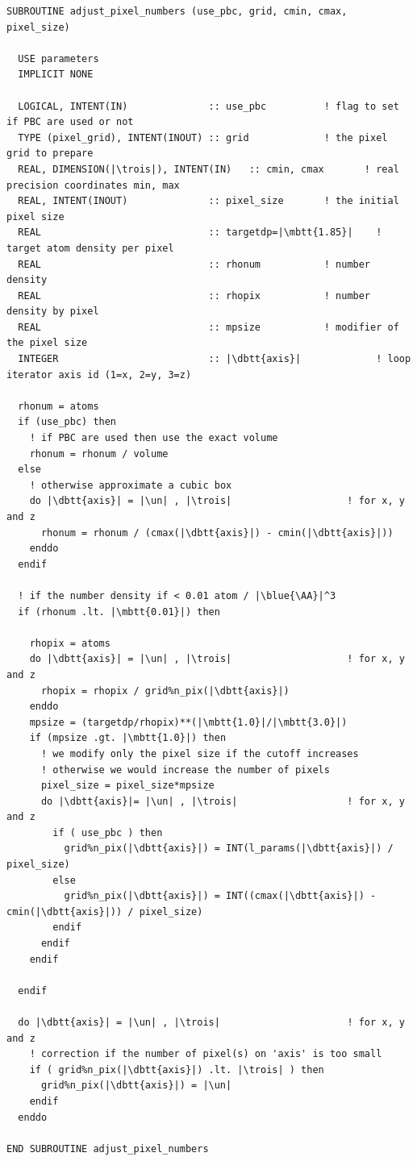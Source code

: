 \begin{lstlisting}[language={[90]FORTRAN}]
SUBROUTINE adjust_pixel_numbers (use_pbc, grid, cmin, cmax, pixel_size)

  USE parameters
  IMPLICIT NONE
  
  LOGICAL, INTENT(IN)              :: use_pbc          ! flag to set if PBC are used or not
  TYPE (pixel_grid), INTENT(INOUT) :: grid             ! the pixel grid to prepare
  REAL, DIMENSION(|\trois|), INTENT(IN)   :: cmin, cmax       ! real precision coordinates min, max
  REAL, INTENT(INOUT)              :: pixel_size       ! the initial pixel size
  REAL                             :: targetdp=|\mbtt{1.85}|    ! target atom density per pixel
  REAL                             :: rhonum           ! number density
  REAL                             :: rhopix           ! number density by pixel
  REAL                             :: mpsize           ! modifier of the pixel size
  INTEGER                          :: |\dbtt{axis}|             ! loop iterator axis id (1=x, 2=y, 3=z)

  rhonum = atoms
  if (use_pbc) then
    ! if PBC are used then use the exact volume
    rhonum = rhonum / volume
  else
    ! otherwise approximate a cubic box
    do |\dbtt{axis}| = |\un| , |\trois|                    ! for x, y and z
      rhonum = rhonum / (cmax(|\dbtt{axis}|) - cmin(|\dbtt{axis}|))
    enddo
  endif

  ! if the number density if < 0.01 atom / |\blue{\AA}|^3
  if (rhonum .lt. |\mbtt{0.01}|) then
  
    rhopix = atoms
    do |\dbtt{axis}| = |\un| , |\trois|                    ! for x, y and z
      rhopix = rhopix / grid%n_pix(|\dbtt{axis}|)
    enddo
    mpsize = (targetdp/rhopix)**(|\mbtt{1.0}|/|\mbtt{3.0}|)
    if (mpsize .gt. |\mbtt{1.0}|) then
      ! we modify only the pixel size if the cutoff increases
      ! otherwise we would increase the number of pixels
      pixel_size = pixel_size*mpsize
      do |\dbtt{axis}|= |\un| , |\trois|                   ! for x, y and z
        if ( use_pbc ) then
          grid%n_pix(|\dbtt{axis}|) = INT(l_params(|\dbtt{axis}|) / pixel_size)
        else
          grid%n_pix(|\dbtt{axis}|) = INT((cmax(|\dbtt{axis}|) - cmin(|\dbtt{axis}|)) / pixel_size) 
        endif
      endif
    endif

  endif

  do |\dbtt{axis}| = |\un| , |\trois|                      ! for x, y and z
    ! correction if the number of pixel(s) on 'axis' is too small
    if ( grid%n_pix(|\dbtt{axis}|) .lt. |\trois| ) then
      grid%n_pix(|\dbtt{axis}|) = |\un|
    endif
  enddo

END SUBROUTINE adjust_pixel_numbers
\end{lstlisting}

